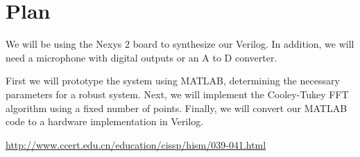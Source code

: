 \documentclass[11pt,letterpaper,oneside]{article}
\begin{document}
	\section{Plan}
	We will be using the Nexys 2 board to synthesize our Verilog.  In addition, we will need a microphone with digital outputs or an A to D converter.
	
	First we will prototype the system using MATLAB, determining the necessary parameters for a robust system.  
	Next, we will implement the Cooley-Tukey FFT algorithm using a fixed number of points.  
	Finally, we will convert our MATLAB code to a hardware implementation in Verilog.
		
	\begin{thebibliography}{9}
		\url{http://www.ccert.edu.cn/education/cissp/hism/039-041.html}
		
	\end{thebibliography}
\end{document}
